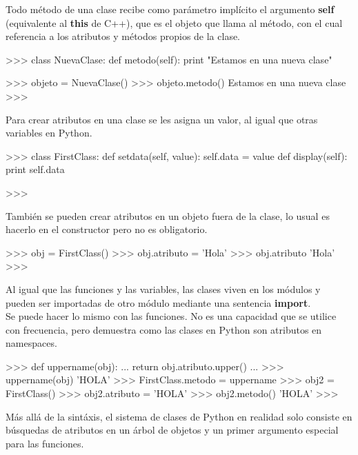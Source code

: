 Todo método de una clase recibe como parámetro implícito el argumento \textbf{self} (equivalente al \textbf{this} de C++), que es el objeto que llama al método, con el cual referencia a los atributos y métodos propios de la clase.\\

\begin{pyglist} [language=python]
>>> class NuevaClase:
        def metodo(self):
            print "Estamos en una nueva clase"
 
>>> objeto = NuevaClase()
>>> objeto.metodo()
Estamos en una nueva clase
>>>
\end{pyglist}

Para crear atributos en una clase se les asigna un valor, al igual que otras variables en Python.\\

\begin{pyglist} [language=python]
>>> class FirstClass:
        def setdata(self, value):
            self.data = value
        def display(self):
            print self.data
    
>>> 
\end{pyglist}

También se pueden crear atributos en un objeto fuera de la clase, lo usual es  hacerlo en el constructor pero no es obligatorio.\\

\begin{pyglist} [language=python]
>>> obj = FirstClass()
>>> obj.atributo = 'Hola'
>>> obj.atributo
'Hola'
>>> 
\end{pyglist}

Al igual que las funciones y las variables, las clases viven en los módulos y pueden ser importadas de otro módulo mediante una sentencia \textbf{import}.\\

Se puede hacer lo mismo con las funciones. No es una capacidad que se utilice con frecuencia, pero demuestra como las clases en Python son atributos en namespaces.\\

\begin{pyglist} [language=python]
>>> def uppername(obj):
...     return obj.atributo.upper()
... 
>>> uppername(obj)
'HOLA'
>>> FirstClass.metodo = uppername
>>> obj2 = FirstClass()
>>> obj2.atributo = 'HOLA'
>>> obj2.metodo()
'HOLA'
>>> 
\end{pyglist}

Más allá de la sintáxis, el sistema de clases de Python en realidad solo consiste en búsquedas de atributos en un árbol de objetos y un primer argumento especial para las funciones.

